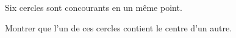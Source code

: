 Six cercles sont concourants en un même point.

Montrer que l’un de ces cercles contient le centre d’un autre.